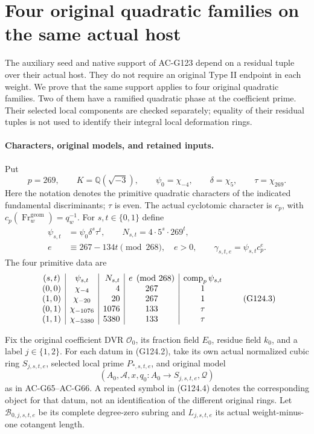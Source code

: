\section{Four original quadratic families on the same actual host}
\label{sec:cubic-quadratic-family-transfer}

The auxiliary seed and native support of AC-G123 depend on a residual
tuple over their actual host.  They do not require an original Type II
endpoint in each weight.  We prove that the same support applies to four
original quadratic families.  Two of them have a ramified quadratic
phase at the coefficient prime.  Their selected local components are
checked separately; equality of their residual tuples is not used to
identify their integral local deformation rings.

\paragraph{Characters, original models, and retained inputs.}
Put
\[
 p=269,\qquad K=\mathbb Q(\sqrt{-3}),\qquad
 \psi_0=\chi_{-4},\qquad \delta=\chi_5,\qquad \tau=\chi_{269}.
 \tag{G124.1}
\]
Here the notation denotes the primitive quadratic characters of the
indicated fundamental discriminants; \(\tau\) is even.  The actual
cyclotomic character is \(c_p\), with
\(c_p(\operatorname{Fr}^{\mathrm{geom}}_w)=q_w^{-1}\).
For \(s,t\in\{0,1\}\) define
\[
 \begin{aligned}
 \psi_{s,t}&=\psi_0\delta^s\tau^t,\qquad
 N_{s,t}=4\cdot5^s\cdot269^t,\\
 e&\equiv267-134t\pmod {268},\quad e>0,\qquad
 \gamma_{s,t,e}=\psi_{s,t}c_p^e.
 \end{aligned}
 \tag{G124.2}
\]
The four primitive data are
\[
\begin{array}{c|c|r|c|c}
 (s,t)&\psi_{s,t}&N_{s,t}&e\pmod {268}&\operatorname{comp}_p\psi_{s,t}\cr
 (0,0)&\chi_{-4}&4&267&1\cr
 (1,0)&\chi_{-20}&20&267&1\cr
 (0,1)&\chi_{-1076}&1076&133&\tau\cr
 (1,1)&\chi_{-5380}&5380&133&\tau
\end{array}
\tag{G124.3}
\]

Fix the original coefficient DVR \(\mathcal O_0\), its fraction field
\(E_0\), residue field \(k_0\), and a label \(j\in\{1,2\}\).
For each datum in (G124.2), take its own actual normalized cubic ring
\(S_{j,s,t,e}\), selected local prime \(P_{*,s,t,e}\), and original
model
\[
 (A_0,\mathcal A,x,q_0:A_0\longrightarrow S_{j,s,t,e},\mathcal Q)
 \tag{G124.4}
\]
as in AC-G65--AC-G66.  A repeated symbol in (G124.4) denotes the
corresponding object for that datum, not an identification of the
different original rings.  Let \(\mathscr B_{0,j,s,t,e}\) be its
complete degree-zero subring and \(L_{j,s,t,e}\) its actual
weight-minus-one cotangent length.

